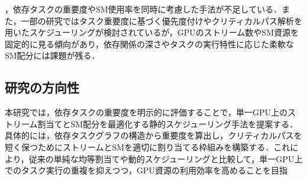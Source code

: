 ，依存タスクの重要度やSM使用率を同時に考慮した手法が不足している．また，一部の研究ではタスク重要度に基づく優先度付けやクリティカルパス解析を用いたスケジューリングが検討されているが，GPUのストリーム数やSM資源を固定的に見る傾向があり，依存関係の深さやタスクの実行特性に応じた柔軟なSM配分には課題が残る．\subsection{研究の方向性}本研究では，依存タスクの重要度を明示的に評価することで，単一GPU上のストリーム割当てとSM配分を最適化する静的スケジューリング手法を提案する．具体的には，依存タスクグラフの構造から重要度を算出し，クリティカルパスを短く保つためにストリームとSMを適切に割り当てる枠組みを構築する．これにより，従来の単純な均等割当てや動的スケジューリングと比較して，単一GPU上でのタスク実行の重複を抑えつつ，GPU資源の利用効率を高めることを目指